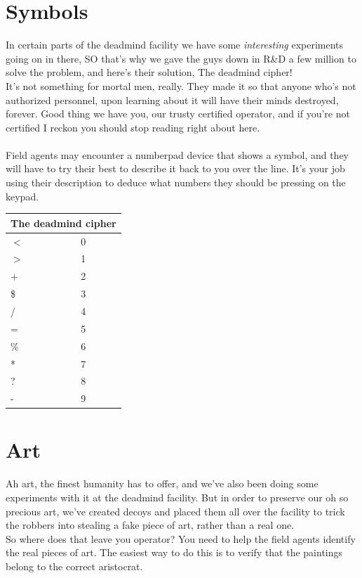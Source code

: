 \documentclass{article}
\begin{document}
\section* {Symbols}
In certain parts of the deadmind facility we have some \textit{interesting} experiments going on in there, SO that's why we gave the guys down in R\&D a few million to solve the problem, and here's their solution, The deadmind cipher!\\ It's not something for mortal men, really. They made it so that anyone who's not authorized personnel, upon learning about it will have their minds destroyed, forever. Good thing we have you, our trusty certified operator, and if you're not certified I reckon you should stop reading right about here.\\\\
Field agents may encounter a numberpad device that shows a symbol, and they will have to try their best to describe it back to you over the line. It's your job using their description to deduce what numbers they should be pressing on the keypad.
\begin{center}
\begin{tabular}{ |p{2cm}||p{3.5cm}| }
 \hline
 \multicolumn{2}{|c|}{The deadmind cipher} \\
 \hline
 $<$& 0\\
 \hline
 $>$& 1\\
 \hline
 $+$   & 2\\
 \hline
 \$   & 3\\
 \hline
 /   & 4\\
 \hline
 =   & 5\\
 \hline
 \%   & 6\\
 \hline
 *   & 7\\
 \hline
 ?   & 8\\
 \hline
 -   & 9\\
 \hline
\end{tabular}
\end{center}

\newpage
\BgThispage
\thispagestyle{empty}
\section*{Art}
Ah art, the finest humanity has to offer, and we've also been doing some experiments with it at the deadmind facility. But in order to preserve our oh so precious art, we've created decoys and placed them all over the facility to trick the robbers into stealing a fake piece of art, rather than a real one.\\
So where does that leave you operator? You need to help the field agents identify the real pieces of art. The easiest way to do this is to verify that the paintings belong to the correct aristocrat.\\
\end{document}
